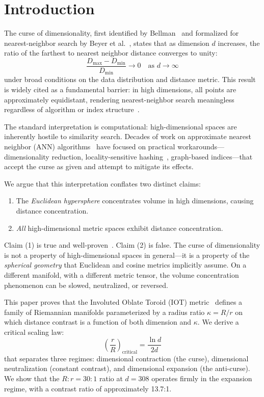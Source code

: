 \section{Introduction}
\label{sec:introduction}

The curse of dimensionality, first identified by Bellman~\cite{bellman1961adaptive} and formalized for nearest-neighbor search by Beyer et al.~\cite{beyer1999curse}, states that as dimension $d$ increases, the ratio of the farthest to nearest neighbor distance converges to unity:
\begin{equation}
    \frac{D_{\max} - D_{\min}}{D_{\min}} \to 0 \quad \text{as } d \to \infty
\end{equation}
under broad conditions on the data distribution and distance metric. This result is widely cited as a fundamental barrier: in high dimensions, all points are approximately equidistant, rendering nearest-neighbor search meaningless regardless of algorithm or index structure~\cite{aggarwal2001surprising}.

The standard interpretation is computational: high-dimensional spaces are inherently hostile to similarity search. Decades of work on approximate nearest neighbor (ANN) algorithms~\cite{malkov2018hnsw,jegou2011product,dasgupta2008random} have focused on practical workarounds---dimensionality reduction, locality-sensitive hashing~\cite{indyk1998approximate}, graph-based indices---that accept the curse as given and attempt to mitigate its effects.

We argue that this interpretation conflates two distinct claims:
\begin{enumerate}
    \item The \emph{Euclidean hypersphere} concentrates volume in high dimensions, causing distance concentration.
    \item \emph{All} high-dimensional metric spaces exhibit distance concentration.
\end{enumerate}

Claim (1) is true and well-proven~\cite{vershynin2018high}. Claim (2) is false. The curse of dimensionality is not a property of high-dimensional spaces in general---it is a property of the \emph{spherical geometry} that Euclidean and cosine metrics implicitly assume. On a different manifold, with a different metric tensor, the volume concentration phenomenon can be slowed, neutralized, or reversed.

This paper proves that the Involuted Oblate Toroid (IOT) metric~\cite{gaddr2025ppf} defines a family of Riemannian manifolds parameterized by a radius ratio $\kappa = R/r$ on which distance contrast is a function of both dimension and $\kappa$. We derive a critical scaling law:
\begin{equation}
    \left(\frac{r}{R}\right)_{\text{critical}} = \frac{\ln d}{2d}
\end{equation}
that separates three regimes: dimensional contraction (the curse), dimensional neutralization (constant contrast), and dimensional expansion (the anti-curse). We show that the $R{:}r = 30{:}1$ ratio at $d = 308$ operates firmly in the expansion regime, with a contrast ratio of approximately 13.7:1.

